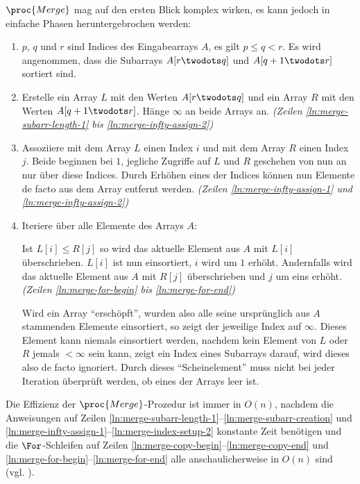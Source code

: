 $\proc{Merge}$ mag auf den ersten Blick komplex wirken, es kann jedoch in einfache Phasen heruntergebrochen werden:
\begin{enumerate}[start=0]
    \item $p$, $q$ und $r$ sind Indices des Eingabearrays $A$, es gilt $p \leq q < r$. Es wird angenommen, dass die Subarrays $A[r \twodots q]$ und $A[q + 1 \twodots r]$ sortiert sind.

    \item Erstelle ein Array $L$ mit den Werten $A[r \twodots q]$ und ein Array $R$ mit den Werten $A[q + 1 \twodots r]$. Hänge $\infty$ an beide Arrays an. \emph{(Zeilen \ref{ln:merge-subarr-length-1} bis \ref{ln:merge-infty-assign-2})}

    \item Assoziiere mit dem Array $L$ einen Index $i$ und mit dem Array $R$ einen Index $j$. Beide beginnen bei $1$, jegliche Zugriffe auf $L$ und $R$ geschehen von nun an nur über diese Indices. Durch Erhöhen eines der Indices können nun Elemente de facto aus dem Array entfernt werden. \emph{(Zeilen \ref{ln:merge-infty-assign-1} und \ref{ln:merge-infty-assign-2})}

    \item Iteriere über alle Elemente des Arrays $A$:

    Ist $L[i] \leq R[j]$ so wird das aktuelle Element aus $A$ mit $L[i]$ überschrieben. $L[i]$ ist nun einsortiert, $i$ wird um $1$ erhöht. Andernfalls wird das aktuelle Element aus $A$ mit $R[j]$ überschrieben und $j$ um eins erhöht. \emph{(Zeilen \ref{ln:merge-for-begin} bis \ref{ln:merge-for-end})}

    Wird ein Array \enquote{erschöpft}, wurden also alle seine ursprünglich aus $A$ stammenden Elemente einsortiert, so zeigt der jeweilige Index auf $\infty$. Dieses Element kann niemals einsortiert werden, nachdem kein Element von $L$ oder $R$ jemals $< \infty$ sein kann, zeigt ein Index eines Subarrays darauf, wird dieses also de facto ignoriert. Durch dieses \enquote{Scheinelement} muss nicht bei jeder Iteration überprüft werden, ob eines der Arrays leer ist.
\end{enumerate}

Die Effizienz der $\proc{Merge}$-Prozedur ist immer in $O(n)$, nachdem die Anweisungen auf Zeilen \ref{ln:merge-subarr-length-1}--\ref{ln:merge-subarr-creation} und \ref{ln:merge-infty-assign-1}--\ref{ln:merge-index-setup-2} konstante Zeit benötigen und die $\For$-Schleifen auf Zeilen \ref{ln:merge-copy-begin}--\ref{ln:merge-copy-end} und \ref{ln:merge-for-begin}--\ref{ln:merge-for-end} alle anschaulicherweise in $O(n)$ sind (vgl. \cite[34]{clrs2001}).

